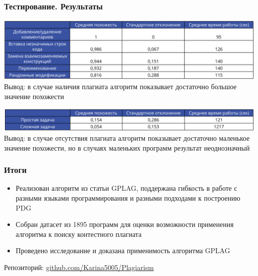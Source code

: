 \documentclass[10pt]{beamer}
\begin{document}
\begin{frame}\frametitle{Тестирование. Результаты}
	\hspace*{-0.6cm}
	\includegraphics[scale=0.6]{res0.png}
	\hspace*{-0.6cm}
	Вывод: в случае наличия плагиата алгоритм показывает \hspace*{-0.6cm} достаточно большое значение похожести
	
	
	\hspace*{-0.6cm}
	\includegraphics[scale=0.6]{res1.png}
	\hspace*{-0.6cm}
	Вывод: в случае отсутствия плагиата алгоритм показывает \hspace*{-0.6cm} достаточно маленькое значение похожести, но в случаях \hspace*{-0.6cm} маленьких программ результат неоднозначный
	
\end{frame}


\begin{frame}\frametitle{Итоги}
	\begin{itemize}
		\item Реализован алгоритм из статьи GPLAG, поддержана гибкость в работе с разными языками программирования и разными подходами к построению PDG
		\item Собран датасет из 1895 программ для оценки возможности применения алгоритма к поиску контестного плагиата
		\item Проведено исследование и доказана применимость алгоритма GPLAG
		\newline
	\end{itemize}

    Репозиторий: \href{https://github.com/Karina5005/Plagiarism}{github.com/Karina5005/Plagiarism}
\end{frame}
\end{document}
